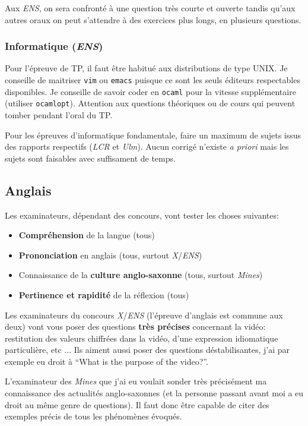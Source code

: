 \documentclass{article}
\begin{document}
Aux \textit{ENS}, on sera confronté à une question très courte et ouverte tandis qu'aux autres oraux on peut s'attendre à des exercices plus longs, en plusieurs questions.

\subsubsection{Informatique (\textit{ENS})}
Pour l'épreuve de TP, il faut être habitué aux distributions de type UNIX.
Je conseille de maitriser \texttt{vim} ou \texttt{emacs} puisque ce sont les seuls éditeurs respectables disponibles.
Je conseille de savoir coder en \texttt{ocaml} pour la vitesse supplémentaire (utiliser \texttt{ocamlopt}).
Attention aux questions théoriques ou de cours qui peuvent tomber pendant l'oral du TP.

Pour les épreuves d'informatique fondamentale, faire un maximum de sujets issus des rapports respectifs (\textit{LCR} et \textit{Ulm}).
Aucun corrigé n'existe \textit{a priori} mais les sujets sont faisables avec suffisament de temps.

\subsection{Anglais}
Les examinateurs, dépendant des concours, vont tester les choses suivantes:


\begin{itemize}
\item  \textbf{Compréhension} de la langue (tous)
\item  \textbf{Prononciation} en anglais (tous, surtout \textit{X}/\textit{ENS})
\item  Connaissance de la \textbf{culture anglo-saxonne} (tous, surtout \textit{Mines})
\item  \textbf{Pertinence et rapidité} de la réflexion (tous)

\end{itemize}

Les examinateurs du concours \textit{X}/\textit{ENS} (l'épreuve d'anglais est commune aux deux) vont vous poser des questions \textbf{très précises} concernant la vidéo: restitution des valeurs chiffrées dans la vidéo, d'une expression idiomatique particulière, etc ...
Ils aiment aussi poser des questions déstabilisantes, j'ai par exemple eu droit à ``What is the purpose of the video?''.

L'examinateur des \textit{Mines} que j'ai eu voulait sonder très précisément ma connaissance des actualités anglo-saxonnes (et la personne passant avant moi a eu droit au même genre de questions).
Il faut donc être capable de citer des exemples précis de tous les phénomènes évoqués.
\end{document}
